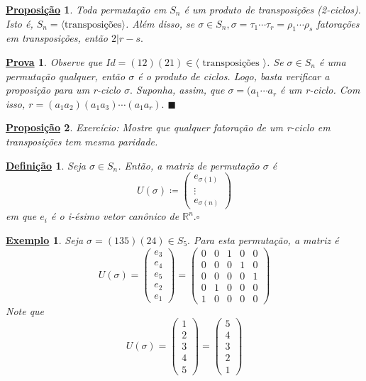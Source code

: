 \documentclass{article}
\newtheorem*{def*}{\underline{Defini\c c\~ao}}
\newtheorem*{prop*}{\underline{Proposi\c c\~ao}}
\newtheorem{example*}{\underline{Exemplo}}
\newtheorem*{proof*}{\underline{Prova}}
\renewcommand\qedsymbol{$\blacksquare$}
\begin{document}
\begin{prop*}
  Toda permuta\c c\~ao em $S_{n}$ \'e um produto de transposi\c c\~oes (2-ciclos). Isto \'e, $S_{n}=\langle\text{transposi\c c\~oes}\rangle$. 
Al\'em disso, se $\sigma\in S_{n}, \sigma=\tau_{1}\cdots\tau_{r} = \rho_{1}\cdots\rho_{s}$ fatora\c c\~oes em transposi\c c\~oes, ent\~ao $2|r-s.$
\end{prop*}
\begin{proof*}
  Observe que $Id = (12)(21)\in\langle\text{ transposi\c c\~oes }\rangle$. Se $\sigma\in S_{n}$ \'e uma permuta\c c\~ao qualquer, ent\~ao $\sigma$ \'e 
o produto de ciclos. Logo, basta verificar a proposi\c c\~ao para um r-ciclo $\sigma.$ Suponha, assim, que $\sigma = (a_{1}\cdots a_{r}$ \'e um r-ciclo.
Com isso, $r=(a_{1}a_{2})(a_{1}a_{3})\cdots(a_{1}a_{r}).$ \qedsymbol
\end{proof*}
\begin{prop*}
  Exerc\'icio: Mostre que qualquer fatora\c c\~ao de um r-ciclo em transposi\c c\~oes tem mesma paridade.
\end{prop*}
\begin{def*}
  Seja $\sigma\in S_{n}$. Ent\~ao, a matriz de permuta\c c\~ao $\sigma$ \'e
  $$
    U(\sigma)\coloneqq \begin{pmatrix}
      e_{\sigma(1)}\\
      \vdots\\
      e_{\sigma(n)}
    \end{pmatrix}
  $$
  em que $e_{i}$ \'e o i-\'esimo vetor can\^onico de $\mathbb{R}^{n}.\square$
\end{def*}
\begin{example*}
  Seja $\sigma = (135)(24)\in S_{5}.$ Para esta permuta\c c\~ao, a matriz \'e
  $$
    U(\sigma) =
    \begin{pmatrix}
      e_{3}\\
      e_{4}\\
      e_{5}\\
      e_{2}\\
      e_{1}
    \end{pmatrix} =
    \begin{pmatrix}
      0 & 0 & 1 & 0 & 0\\
      0 & 0 & 0 & 1 & 0\\
      0 & 0 & 0 & 0 & 1\\
      0 & 1 & 0 & 0 & 0\\
      1 & 0 & 0 & 0 & 0
    \end{pmatrix}
  $$
  Note que 
  $$
    U(\sigma) = \begin{pmatrix}
      1\\
      2\\
      3\\
      4\\
      5
    \end{pmatrix} =
    \begin{pmatrix}
      5\\
      4\\
      3\\
      2\\
      1
    \end{pmatrix}
  $$
\end{example*}
\end{document}
